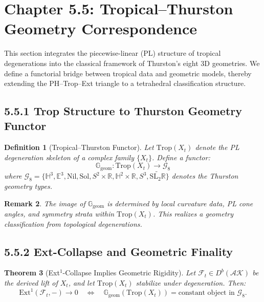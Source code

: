 \documentclass[11pt]{article}
\newtheorem{theorem}{Theorem}[section]
\newtheorem{definition}[theorem]{Definition}
\newtheorem{remark}[theorem]{Remark}
\begin{document}
\section{Chapter 5.5: Tropical–Thurston Geometry Correspondence}
\label{sec:thurston}

This section integrates the piecewise-linear (PL) structure of tropical degenerations into the classical framework of Thurston’s eight 3D geometries. We define a functorial bridge between tropical data and geometric models, thereby extending the PH–Trop–Ext triangle to a tetrahedral classification structure.

\subsection{5.5.1 Trop Structure to Thurston Geometry Functor}

\begin{definition}[Tropical–Thurston Functor]
Let \( \mathrm{Trop}(X_t) \) denote the PL degeneration skeleton of a complex family \( \{X_t\} \). Define a functor:
\[
\mathbb{G}_\mathrm{geom} : \mathrm{Trop}(X_t) \longrightarrow \mathcal{G}_8
\]
where \( \mathcal{G}_8 = \{ \mathbb{H}^3, \mathbb{E}^3, \text{Nil}, \text{Sol}, S^2 \times \mathbb{R}, \mathbb{H}^2 \times \mathbb{R}, S^3, \widetilde{\text{SL}_2\mathbb{R}} \} \) denotes the Thurston geometry types.
\end{definition}

\begin{remark}
The image of \( \mathbb{G}_\mathrm{geom} \) is determined by local curvature data, PL cone angles, and symmetry strata within \( \mathrm{Trop}(X_t) \). This realizes a geometry classification from topological degenerations.
\end{remark}

\subsection{5.5.2 Ext-Collapse and Geometric Finality}

\begin{theorem}[Ext$^1$-Collapse Implies Geometric Rigidity]
Let \( \mathcal{F}_t \in D^b(\mathcal{AK}) \) be the derived lift of \( X_t \), and let \( \mathrm{Trop}(X_t) \) stabilize under degeneration. Then:
\[
\mathrm{Ext}^1(\mathcal{F}_t, -) \to 0 \quad \Longleftrightarrow \quad \mathbb{G}_\mathrm{geom}(\mathrm{Trop}(X_t)) = \text{constant object in } \mathcal{G}_8.
\]
\end{theorem}
\end{document}
